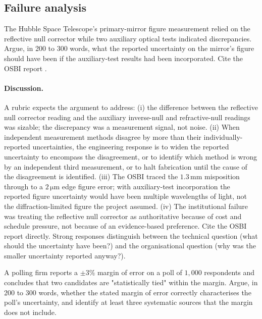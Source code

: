 \subsection*{Failure analysis}

\begin{exercise}
The Hubble Space Telescope's primary-mirror figure measurement
relied on the reflective null corrector while two auxiliary
optical tests indicated discrepancies. Argue, in 200 to 300
words, what the reported uncertainty on the mirror's figure should
have been if the auxiliary-test results had been incorporated.
Cite the OSBI report \cite{acc:nasa-hubble-optical-systems-1990}.
\end{exercise}

\paragraph{Discussion.}
A rubric expects the argument to address: (i) the difference
between the reflective null corrector reading and the auxiliary
inverse-null and refractive-null readings was sizable; the
discrepancy was a measurement signal, not noise. (ii) When
independent measurement methods disagree by more than their
individually-reported uncertainties, the engineering response is
to widen the reported uncertainty to encompass the disagreement,
or to identify which method is wrong by an independent third
measurement, or to halt fabrication until the cause of the
disagreement is identified. (iii) The OSBI traced the
$1.3 \,\si{\milli\meter}$ misposition through to a $2 \,\si
{\micro\meter}$ edge figure error; with auxiliary-test
incorporation the reported figure uncertainty would have been
multiple wavelengths of light, not the diffraction-limited figure
the project assumed. (iv) The institutional failure was treating
the reflective null corrector as authoritative because of cost
and schedule pressure, not because of an evidence-based
preference. Cite the OSBI report directly. Strong responses
distinguish between the technical question (what should the
uncertainty have been?) and the organisational question (why was
the smaller uncertainty reported anyway?).

\begin{exercise}
A polling firm reports a $\pm 3\%$ margin of error on a poll of
$1{,}000$ respondents and concludes that two candidates are
"statistically tied" within the margin. Argue, in 200 to 300
words, whether the stated margin of error correctly characterises
the poll's uncertainty, and identify at least three systematic
sources that the margin does not include.
\end{exercise}

